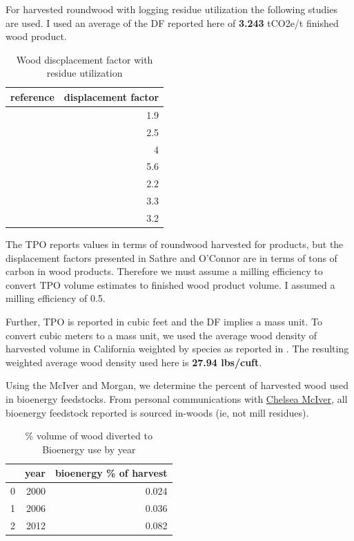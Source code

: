\documentclass[a4paper]{article}
\begin{document}
For harvested roundwood with logging residue utilization the following
studies are used. I used an average of the DF reported here of \textbf{3.243} tCO2e/t finished
wood product.


\begin{table}[htb]
\centering
\begin{tabular}{lr}
reference & displacement factor\\
\hline
\citet{Eriksson2007} & 1.9\\
\citet{Eriksson2007} & 2.5\\
\citet{Gustavsson2006a} & 4\\
\citet{Gustavsson2006a} & 5.6\\
\citet{Gustavsson2006a} & 2.2\\
\citet{Gustavsson2006a} & 3.3\\
\citet{Pingoud2001} & 3.2\\
\end{tabular}
\caption{Wood discplacement factor with residue utilization \label{tab:df_inc_use}}

\end{table}



The TPO reports values in terms of roundwood harvested for products, but the
displacement factors presented in Sathre and O'Connor are in terms of
tons of carbon in wood products. Therefore we must assume a milling
efficiency to convert TPO volume estimates to finished wood product volume. I assumed
a milling efficiency of 0.5.


Further, TPO is reported in cubic feet and the DF implies a mass
unit. To convert cubic meters to a mass unit, we used the average wood
density of harvested volume in California weighted by species as reported 
in \citet{Mciver2012}. The resulting weighted average wood density used here is \textbf{27.94
lbs/cuft}.


Using the McIver and Morgan, we determine the percent of harvested wood used in bioenergy
feedstocks. From personal communications with
\href{http://www.bber.umt.edu/staff/mciver.asp}{Chelsea McIver}, all bioenergy feedstock reported is sourced in-woods (ie, not mill
residues).

\begin{table}[htb]
\centering
\begin{tabular}{rrr}
 & year & bioenergy \% of harvest\\
\hline
0 & 2000 & 0.024\\
1 & 2006 & 0.036\\
2 & 2012 & 0.082\\
\end{tabular}
\caption{\% volume of wood diverted to Bioenergy use by year \label{tab:bio_vol}}

\end{table}
\end{document}
